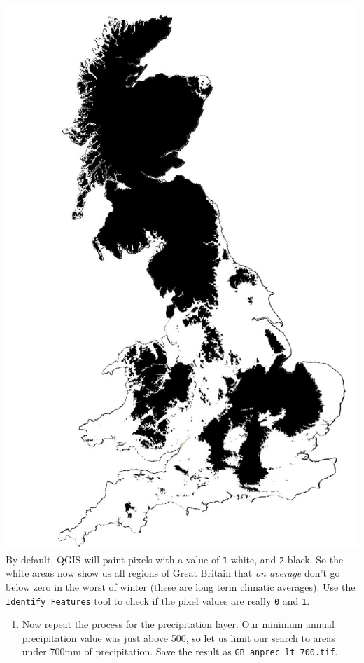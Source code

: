 \documentclass[
  letterpaper,
  DIV=11,
  numbers=noendperiod]{scrreprt}
\providecommand{\tightlist}{%
  \setlength{\itemsep}{0pt}\setlength{\parskip}{0pt}}\usepackage{longtable,booktabs,array}
\begin{document}
\includegraphics{images/lab_6/lab_6_fig3_mintemp_gt_0.jpg} By default,
QGIS will paint pixels with a value of \texttt{1} white, and \texttt{2}
black. So the white areas now show us all regions of Great Britain that
\emph{on average} don't go below zero in the worst of winter (these are
long term climatic averages). Use the \texttt{Identify\ Features} tool
to check if the pixel values are really \texttt{0} and \texttt{1}.

\begin{enumerate}
\def\labelenumi{(\arabic{enumi})}
\setcounter{enumi}{168}
\tightlist
\item
  Now repeat the process for the precipitation layer. Our minimum annual
  precipitation value was just above 500, so let us limit our search to
  areas under 700mm of precipitation. Save the result as
  \texttt{GB\_anprec\_lt\_700.tif}.
\end{enumerate}
\end{document}
